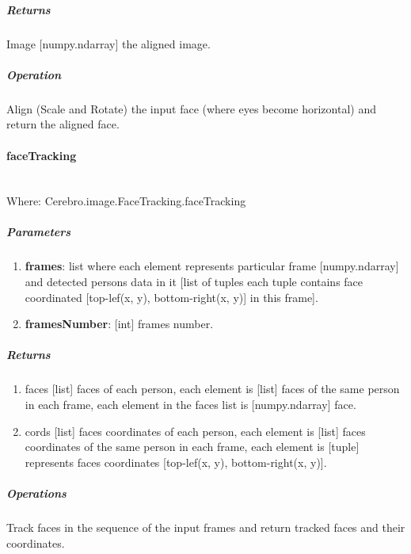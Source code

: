 \subparagraph{Returns}
\begin{changemargin}{1cm}{0cm}
	Image [numpy.ndarray] the aligned image.
\end{changemargin}

\subparagraph{Operation}
\begin{changemargin}{1cm}{0cm}
	Align (Scale and Rotate) the input face (where eyes become horizontal) and return the aligned face.
\end{changemargin}
\hrulefill

\paragraph{faceTracking} \mbox{} \\
Where: Cerebro.image.FaceTracking.faceTracking
\subparagraph{Parameters}
\begin{changemargin}{0.5cm}{0cm}
	\begin{enumerate}
		\item \textbf{frames}: list where each element represents particular frame [numpy.ndarray] and detected persons data in it [list of tuples each tuple contains face coordinated [top-lef(x, y), bottom-right(x, y)] in this frame].
		\item \textbf{framesNumber}: [int] frames number.
	\end{enumerate}
\end{changemargin}

\subparagraph{Returns}
\begin{changemargin}{1cm}{0cm}
	\begin{enumerate} 
		\item faces [list] faces of each person, each element is [list] faces of the same person in each frame, each element in the faces list is [numpy.ndarray] face.
		\item cords [list] faces coordinates of each person, each element is [list] faces coordinates of the same person in each frame, each element is [tuple] represents faces coordinates [top-lef(x, y), bottom-right(x, y)].
	\end{enumerate}
\end{changemargin}

\subparagraph{Operations}
\begin{changemargin}{1cm}{0cm}
	Track faces in the sequence of the input frames and return tracked faces and their coordinates.
\end{changemargin}